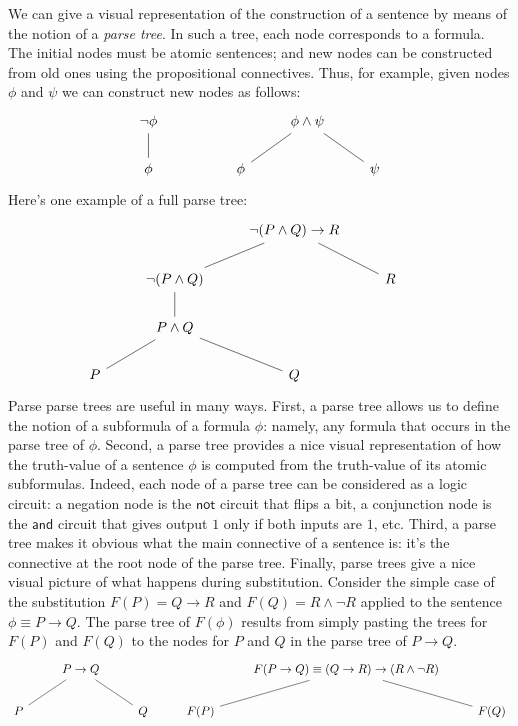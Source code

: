 We can give a visual representation of the construction of a sentence
by means of the notion of a \emph{parse tree}.  In such a tree, each
node corresponds to a formula.  The initial nodes must be atomic
sentences; and new nodes can be constructed from old ones using the
propositional connectives.  Thus, for example, given nodes $\phi$ and
$\psi$ we can construct new nodes as follows:
\[ \begin{tikzcd}
  \neg\phi\arrow[-]{d} & & & \phi\wedge \psi \arrow[-]{dl} \arrow[-]{dr} \\
  \phi & & \phi & & \psi \end{tikzcd} \]
Here's one example of a full parse tree:
\[ \begin{tikzcd}
    & & \neg (P\wedge Q)\to R \arrow[-]{dl} \arrow[-]{dr} & & \\
    & \neg (P\wedge Q) \arrow[-]{d} & & R & \\
    & P\wedge Q \arrow[-]{dl} \arrow[-]{dr}       & &  & \\
    P & & Q & & \end{tikzcd} \] Parse parse trees are useful in many
ways.  First, a parse tree allows us to define the notion of a
\gls{subformula} of a formula $\phi$: namely, any formula that occurs
in the parse tree of $\phi$.  Second, a parse tree provides a nice
visual representation of how the truth-value of a sentence $\phi$ is
computed from the truth-value of its atomic subformulas.  Indeed, each
node of a parse tree can be considered as a logic circuit: a negation
node is the $\mathsf{not}$ circuit that flips a bit, a conjunction
node is the $\mathsf{and}$ circuit that gives output $1$ only if both
inputs are $1$, etc.  Third, a parse tree makes it obvious what the
\gls{main connective} of a sentence is: it's the connective at the
root node of the parse tree.  Finally, parse trees give a nice visual
picture of what happens during \gls{substitution}.  Consider the
simple case of the substitution $F(P)=Q\to R$ and
$F(Q)=R\wedge \neg R$ applied to the sentence $\phi\equiv P\to Q$.
The parse tree of $F(\phi )$ results from simply pasting the trees for
$F(P)$ and $F(Q)$ to the nodes for $P$ and $Q$ in the parse tree of
$P\to Q$.
\[ \begin{tikzcd}
    & P\to Q \arrow[-]{dl} \arrow[-]{dr} &    & & F(P\to Q)\equiv (Q\to R)\to
    (R\wedge\neg R) \arrow[-]{dl} \arrow[-]{dr} & \\
  P &        & Q  & F(P) &                    & F(Q) 
\end{tikzcd} \] 

